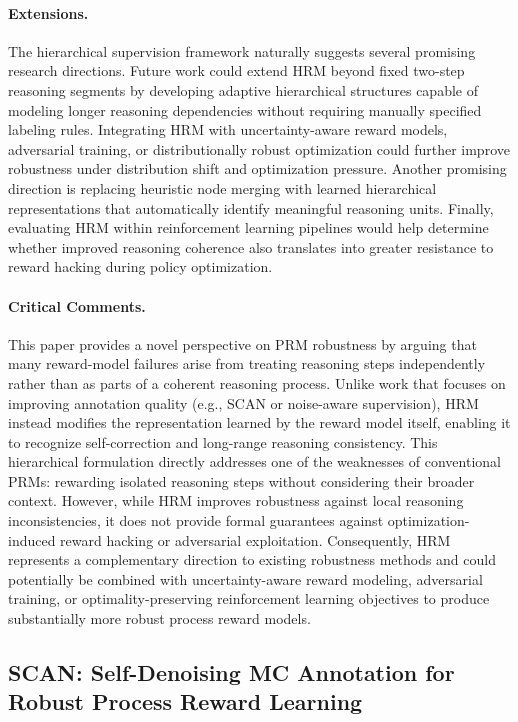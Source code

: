 \documentclass[11pt]{article}
\begin{document}
\paragraph{Extensions.}
The hierarchical supervision framework naturally suggests several promising research directions. Future work could extend HRM beyond fixed two-step reasoning segments by developing adaptive hierarchical structures capable of modeling longer reasoning dependencies without requiring manually specified labeling rules. Integrating HRM with uncertainty-aware reward models, adversarial training, or distributionally robust optimization could further improve robustness under distribution shift and optimization pressure. Another promising direction is replacing heuristic node merging with learned hierarchical representations that automatically identify meaningful reasoning units. Finally, evaluating HRM within reinforcement learning pipelines would help determine whether improved reasoning coherence also translates into greater resistance to reward hacking during policy optimization.

\paragraph{Critical Comments.}
This paper provides a novel perspective on PRM robustness by arguing that many reward-model failures arise from treating reasoning steps independently rather than as parts of a coherent reasoning process. Unlike work that focuses on improving annotation quality (e.g., SCAN or noise-aware supervision), HRM instead modifies the representation learned by the reward model itself, enabling it to recognize self-correction and long-range reasoning consistency. This hierarchical formulation directly addresses one of the weaknesses of conventional PRMs: rewarding isolated reasoning steps without considering their broader context. However, while HRM improves robustness against local reasoning inconsistencies, it does not provide formal guarantees against optimization-induced reward hacking or adversarial exploitation. Consequently, HRM represents a complementary direction to existing robustness methods and could potentially be combined with uncertainty-aware reward modeling, adversarial training, or optimality-preserving reinforcement learning objectives to produce substantially more robust process reward models.  

\subsection{SCAN: Self-Denoising MC Annotation for Robust Process Reward Learning}
\end{document}
